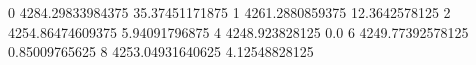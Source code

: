 0 4284.29833984375 35.37451171875
1 4261.2880859375 12.3642578125
2 4254.86474609375 5.94091796875
4 4248.923828125 0.0
6 4249.77392578125 0.85009765625
8 4253.04931640625 4.12548828125
